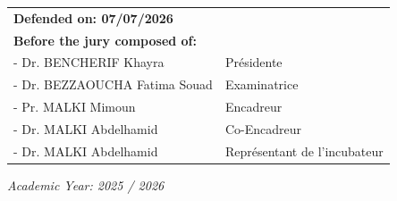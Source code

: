 \begin{titlepage}
\vspace{0.3cm}
\begin{minipage}{0.92\textwidth}
\begin{tabular}{@{}>{\raggedright\arraybackslash}p{}>{\raggedright\arraybackslash}p{}@{}}
\textbf{Defended on: 07/07/2026} & \\
\textbf{Before the jury composed of:} & \\
- Dr. BENCHERIF Khayra & Présidente\\
- Dr. BEZZAOUCHA Fatima Souad & Examinatrice\\
- Pr. MALKI Mimoun & Encadreur\\
- Dr. MALKI Abdelhamid & Co-Encadreur \\
- Dr. MALKI Abdelhamid & Représentant de l’incubateur
\end{tabular}
\end{minipage}

    \vfill
{\large \textit{Academic Year: 2025 / 2026}\par}
\end{titlepage}
\onehalfspacing

